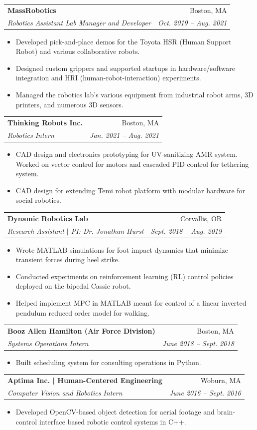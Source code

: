 \documentclass[letterpaper,11pt]{article}
\makeatletter
\newcommand{\resumeItem}[1]{
  \item\small{
    {#1 \vspace{-2pt}}
  }
}
\newcommand{\resumeSubheading}[4]{
  \vspace{-2pt}\item
    \begin{tabular*}{0.97\textwidth}[t]{l@{\extracolsep{\fill}}r}
      \textbf{#1} & #2 \\
      \textit{\small#3} & \textit{\small #4} \\
    \end{tabular*}\vspace{-7pt}
}
\newcommand{\resumeSubSubheading}[2]{
    \item
    \begin{tabular*}{0.97\textwidth}{l@{\extracolsep{\fill}}r}
      \textit{\small#1} & \textit{\small #2} \\
    \end{tabular*}\vspace{-7pt}
}
\newcommand{\resumeSubHeadingListEnd}{\end{itemize}}
\newcommand{\resumeItemListStart}{\begin{itemize}}
\newcommand{\resumeItemListEnd}{\end{itemize}\vspace{-5pt}}
\makeatother
\begin{document}
    \resumeSubheading
      {MassRobotics}{Boston, MA}
      {Robotics Assistant Lab Manager and Developer}{Oct. 2019 -- Aug. 2021}
      \resumeItemListStart
        \resumeItem{Developed pick-and-place demos for the Toyota HSR (Human Support Robot) and various collaborative robots.}
        \resumeItem{Designed custom grippers and supported startups in hardware/software integration and HRI (human-robot-interaction) experiments.}
        \resumeItem{Managed the robotics lab's various equipment from industrial robot arms, 3D printers, and numerous 3D sensors.}
      \resumeItemListEnd

    \resumeSubheading
      {Thinking Robots Inc.}{Boston, MA}
      {Robotics Intern}{Jan. 2021 -- Aug. 2021}
      \resumeItemListStart
        \resumeItem{CAD design and electronics prototyping for UV-sanitizing AMR system. Worked on vector control for motors and cascaded PID control for tethering system.}
        \resumeItem{CAD design for extending Temi robot platform with modular hardware for social robotics.}
      \resumeItemListEnd

    \resumeSubheading
      {Dynamic Robotics Lab}{Corvallis, OR}
      {Research Assistant $|$ PI: Dr. Jonathan Hurst}{Sept. 2018 -- Aug. 2019}
      \resumeItemListStart
        \resumeItem{Wrote MATLAB simulations for foot impact dynamics that minimize transient forces during heel strike.}
        \resumeItem{Conducted experiments on reinforcement learning (RL) control policies deployed on the bipedal Cassie robot.}
        \resumeItem{Helped implement MPC in MATLAB meant for control of a linear inverted pendulum reduced order model for walking.}
      \resumeItemListEnd

    \resumeSubheading
      {Booz Allen Hamilton (Air Force Division)}{Boston, MA}
      {Systems Operations Intern}{June 2018 -- Sept. 2018}
      \resumeItemListStart
        \resumeItem{Built scheduling system for consulting operations in Python.}
      \resumeItemListEnd

    \resumeSubheading
      {Aptima Inc. | Human-Centered Engineering}{Woburn, MA}
      {Computer Vision and Robotics Intern}{June 2016 -- Sept. 2016}
      \resumeItemListStart
        \resumeItem{Developed OpenCV-based object detection for aerial footage and brain-control interface based robotic control systems in C++.}
      \resumeItemListEnd


      
\end{document}
